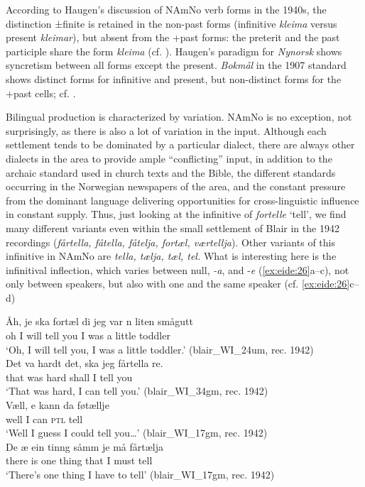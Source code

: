 \documentclass[output=paper]{langscibook}
\begin{document}
According to Haugen’s discussion of NAmNo verb forms in the 1940s, the distinction ±finite is retained in the non-past forms (infinitive \textit{kleima} versus present \textit{kleimar}), but absent from the +past forms: the preterit and the past participle share the form \textit{kleima} (cf. ). Haugen’s paradigm for \textit{Nynorsk} shows syncretism between all forms except the present. \textit{Bokmål} in the 1907 standard shows distinct forms for infinitive and present, but non-distinct forms for the +past cells; cf. . 

Bilingual production is characterized by variation. NAmNo is no exception, not surprisingly, as there is also a lot of variation in the input. Although each settlement tends to be dominated by a particular dialect, there are always other dialects in the area to provide ample “conflicting” input, in addition to the archaic standard used in church texts and the Bible, the different standards occurring in the Norwegian newspapers of the area, and the constant pressure from the dominant language delivering opportunities for cross-linguistic influence in constant supply. Thus, just looking at the infinitive of \textit{fortelle} ‘tell’, we find many different variants even within the small settlement of Blair in the 1942 recordings (\textit{fårtella, fåtella, fåtelja, fortæl, værtellja}). Other variants of this infinitive in NAmNo are \textit{tella, tælja, tæl, tel.} What is interesting here is the infinitival inflection, which varies between null, \textit{-a}, and -\textit{e} (\ref{ex:eide:26}a--c), not only between speakers, but also with one and the same speaker (cf. \ref{ex:eide:26}c--d)

\ea%
    \label{ex:eide:26}
    \ea  
    \gll Åh, je ska fortæl di jeg var n liten smågutt      \\
         oh I will tell you I was a little toddler\\
    \glt ‘Oh, I will tell you, I was a little toddler.’ (blair\_WI\_24um, rec. 1942)\\
    \ex  
    \gll Det va hardt det, ska jeg fårtella re.  \\
         that was hard {} shall I tell you      \\
    \glt ‘That was hard, I can tell you.’ (blair\_WI\_34gm, rec. 1942)\\
    \ex  
    \gll Væll, e kann da føtællje        \\
         well I can \textsc{ptl} tell          \\
    \glt ‘Well I guess I could tell you…’ (blair\_WI\_17gm, rec. 1942)\\
    \ex  
    \gll De æ ein tinng såmm je må fårtælja  \\
         there is one thing that I must tell \\
    \glt ‘There’s one thing I have to tell’ (blair\_WI\_17gm, rec. 1942)\\
    \z %
\z
\end{document}

